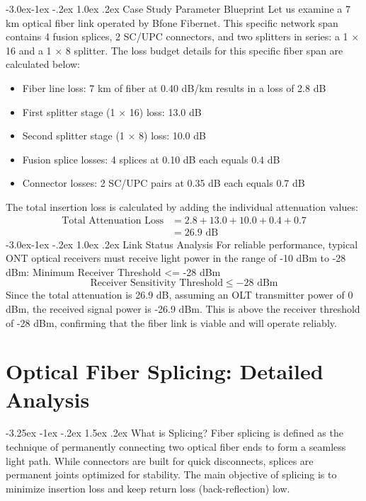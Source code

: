 \documentclass[11pt,a4paper]{report}
\makeatletter
\renewcommand{\section}{\@startsection{section}{1}{\z@}%
  {-3.25ex \@plus -1ex \@minus -.2ex}%
  {1.5ex \@plus.2ex}%
  {\normalfont\Large\bfseries\color{primaryColor}}}
\renewcommand{\subsection}{\@startsection{subsection}{2}{\z@}%
  {-3.0ex\@plus -1ex \@minus -.2ex}%
  {1.0ex \@plus .2ex}%
  {\normalfont\large\bfseries\color{secondaryColor}}}
\makeatother
\begin{document}
\subsection{Case Study Parameter Blueprint}
Let us examine a 7 km optical fiber link operated by Bfone Fibernet. This specific network span contains 4 fusion splices, 2 SC/UPC connectors, and two splitters in series: a 1 $\times$ 16 and a 1 $\times$ 8 splitter. The loss budget details for this specific fiber span are calculated below:
\begin{itemize}
  \item Fiber line loss: 7 km of fiber at 0.40 dB/km results in a loss of 2.8 dB
  \item First splitter stage (1 $\times$ 16) loss: 13.0 dB
  \item Second splitter stage (1 $\times$ 8) loss: 10.0 dB
  \item Fusion splice losses: 4 splices at 0.10 dB each equals 0.4 dB
  \item Connector losses: 2 SC/UPC pairs at 0.35 dB each equals 0.7 dB
\end{itemize}
The total insertion loss is calculated by adding the individual attenuation values:
\begin{align*} \text{Total Attenuation Loss} &= 2.8 + 13.0 + 10.0 + 0.4 + 0.7 \\ &= 26.9\text{ dB} \end{align*}
\subsection{Link Status Analysis}
For reliable performance, typical ONT optical receivers must receive light power in the range of -10 dBm to -28 dBm: Minimum Receiver Threshold <= -28 dBm
\begin{equation}\text{Receiver Sensitivity Threshold} \le -28\text{ dBm}\end{equation}
Since the total attenuation is 26.9 dB, assuming an OLT transmitter power of 0 dBm, the received signal power is -26.9 dBm. This is above the receiver threshold of -28 dBm, confirming that the fiber link is viable and will operate reliably.
\chapter{Optical Fiber Splicing: Detailed Analysis}
\section{What is Splicing?}
Fiber splicing is defined as the technique of permanently connecting two optical fiber ends to form a seamless light path. While connectors are built for quick disconnects, splices are permanent joints optimized for stability. The main objective of splicing is to minimize insertion loss and keep return loss (back-reflection) low.
\end{document}
